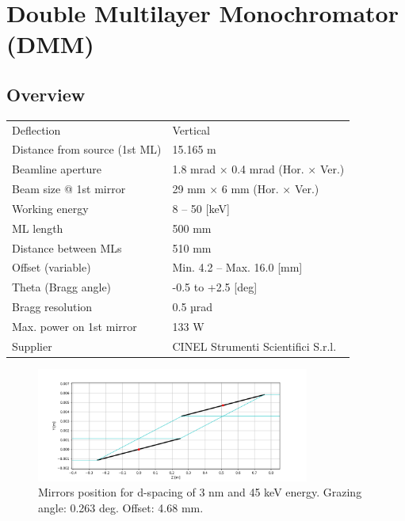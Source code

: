 \section{Double Multilayer Monochromator (DMM)}
\subsection{Overview}

\begin{center}
\begin{tabular}[bhp]{|p{} | p{}|}
\hline
Deflection & Vertical \\
Distance from source (1st ML) & 15.165 m \\
Beamline aperture & 1.8 mrad × 0.4 mrad (Hor. × Ver.) \\
Beam size @ 1st mirror & 29 mm × 6 mm (Hor. × Ver.) \\
Working energy & 8 – 50 [keV] \\
ML length & 500 mm \\
Distance between MLs & 510 mm \\
Offset (variable) & Min. 4.2 – Max. 16.0 [mm] \\
Theta (Bragg angle) & -0.5 to +2.5 [deg] \\
Bragg resolution & 0.5 µrad \\
Max. power on 1st mirror & 133 W \\
Supplier & CINEL Strumenti Scientifici S.r.l. \\
\hline
\end{tabular}
\end{center}

\begin{figure}[ht]
\centering
\includegraphics[width=0.8\textwidth]{./../figures/operation/DMM_mirrors_d3_E45_gr0.263_offset4.68.png}
\caption{\label{fig:DMM_mirrors_45keV} Mirrors position for d-spacing of 3 nm and 45 keV energy. Grazing angle: 0.263 deg. Offset: 4.68 mm.}
\end{figure}


